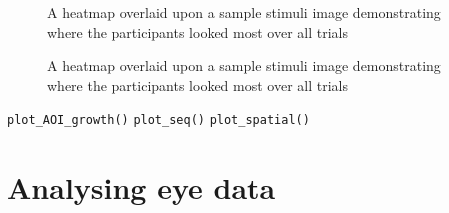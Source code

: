 \documentclass[
  man,
  floatsintext,
  longtable,
  nolmodern,
  notxfonts,
  notimes,
  colorlinks=true,linkcolor=blue,citecolor=blue,urlcolor=blue]{apa7}
\begin{document}
\begin{figure}[H]

\caption{\label{fig-heatmap}A heatmap overlaid upon a sample stimuli
image demonstrating where the participants looked most over all trials}


\end{figure}%

\begin{figure}[H]

\caption{\label{fig-heatmap-alpha-update}A heatmap overlaid upon a
sample stimuli image demonstrating where the participants looked most
over all trials}


\end{figure}%

\texttt{plot\_AOI\_growth()} \texttt{plot\_seq()}
\texttt{plot\_spatial()}

\section{Analysing eye data}\label{analysing-eye-data}
\end{document}
